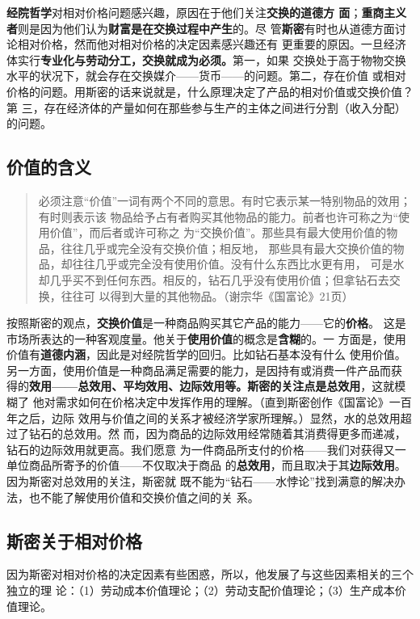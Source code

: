 \textbf{经院哲学}对相对价格问题感兴趣，原因在于他们关注\textbf{交换的道德方
  面}；\textbf{重商主义者}则是因为他们认为\textbf{财富是在交换过程中产生}的。尽
管\textbf{斯密}有时也从道德方面讨论相对价格，然而他对相对价格的决定因素感兴趣还有
更重要的原因。一旦经济体实行\textbf{专业化与劳动分工，交换就成为必须。}第一，如果
交换处于高于物物交换水平的状况下，就会存在交换媒介——货币——的问题。第二，存在价值
或相对价格的问题。用斯密的话来说就是，什么原理决定了产品的相对价值或交换价值？第
三，存在经济体的产量如何在那些参与生产的主体之间进行分割（收入分配）的问题。

\subsection{价值的含义}

\begin{quotation}
必须注意“价值”一词有两个不同的意思。有时它表示某一特别物品的效用；有时则表示该
物品给予占有者购买其他物品的能力。前者也许可称之为“使用价值”，而后者或许可称之
为“交换价值”。那些具有最大使用价值的物品，往往几乎或完全没有交换价值；相反地，
那些具有最大交换价值的物品，却往往几乎或完全没有使用价值。没有什么东西比水更有用，
可是水却几乎买不到任何东西。相反的，钻石几乎没有使用价值；但拿钻石去交换，往往可
以得到大量的其他物品。（谢宗华《国富论》21页）
\end{quotation}

按照斯密的观点，\textbf{交换价值}是一种商品购买其它产品的能力——它的\textbf{价格}。
这是市场所表达的一种客观度量。他关于\textbf{使用价值}的概念是\textbf{含糊}的。一
方面是，使用价值有\textbf{道德内涵}，因此是对经院哲学的回归。比如钻石基本没有什么
使用价值。另一方面，使用价值是一种商品满足需要的能力，是因持有或消费一件产品而获
得的\textbf{效用——总效用、平均效用、边际效用等。斯密的关注点是总效用}，这就模糊了
他对需求如何在价格决定中发挥作用的理解。（直到斯密创作《国富论》一百年之后，边际
效用与价值之间的关系才被经济学家所理解。）显然，水的总效用超过了钻石的总效用。然
而，因为商品的边际效用经常随着其消费得更多而递减，钻石的边际效用就更高。我们愿意
为一件商品所支付的价格——我们对获得又一单位商品所寄予的价值——不仅取决于商品
的\textbf{总效用}，而且取决于其\textbf{边际效用}。因为斯密对总效用的关注，斯密就
既不能为“钻石——水悖论”找到满意的解决办法，也不能了解使用价值和交换价值之间的关
系。

\subsection{斯密关于相对价格}

因为斯密对相对价格的决定因素有些困惑，所以，他发展了与这些因素相关的三个独立的理
论：（1）劳动成本价值理论；（2）劳动支配价值理论；（3）生产成本价值理论。

